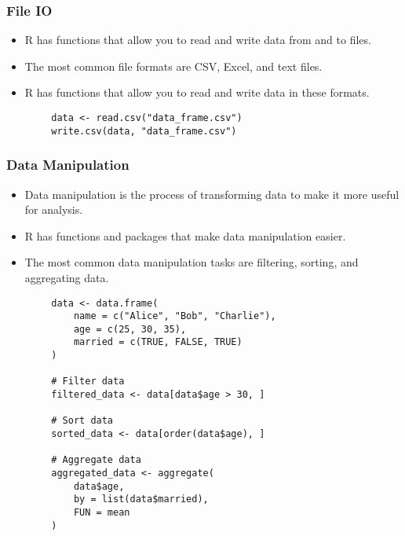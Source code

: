 \documentclass[serif, 9pt, aspectratio=32]{beamer}
\begin{document}
\begin{frame}
    \centering
    \frametitle{File IO}
    \begin{itemize}
        \setlength{\itemsep}{2em}
        \item R has functions that allow you to read and write data from and to files.
        \item The most common file formats are CSV, Excel, and text files.
        \item R has functions that allow you to read and write data in these formats.
    \end{itemize}
\end{frame}

\begin{frame}[fragile]
    \begin{lstlisting}
        data <- read.csv("data_frame.csv")
        write.csv(data, "data_frame.csv")
    \end{lstlisting}
\end{frame}

\begin{frame}
    \centering
    \frametitle{Data Manipulation}
    \begin{itemize}
        \setlength{\itemsep}{2em}
        \item Data manipulation is the process of transforming data to make it more useful for analysis.
        \item R has functions and packages that make data manipulation easier.
        \item The most common data manipulation tasks are filtering, sorting, and aggregating data.
    \end{itemize}
\end{frame}

\begin{frame}[fragile]
    \begin{lstlisting}
        data <- data.frame(
            name = c("Alice", "Bob", "Charlie"),
            age = c(25, 30, 35),
            married = c(TRUE, FALSE, TRUE)
        )

        # Filter data
        filtered_data <- data[data$age > 30, ]

        # Sort data
        sorted_data <- data[order(data$age), ]

        # Aggregate data
        aggregated_data <- aggregate(
            data$age,
            by = list(data$married),
            FUN = mean
        )
    \end{lstlisting}
\end{frame}
\end{document}
